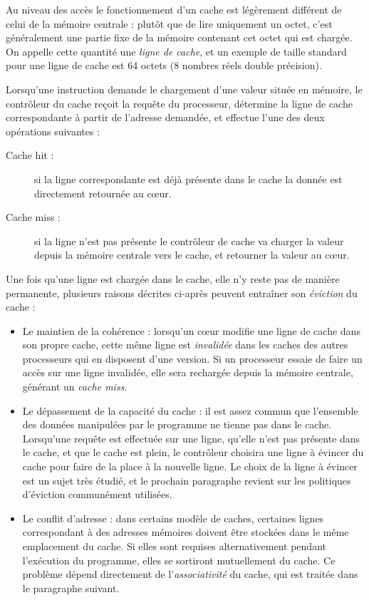 Au niveau des accès le fonctionnement d'un cache est légèrement différent de celui de la mémoire centrale : plutôt que de lire uniquement un octet, c'est généralement une partie fixe de la mémoire contenant cet octet qui est chargée.
On appelle cette quantité une \emph{ligne de cache}, et un exemple de taille standard pour une ligne de cache est 64 octets (8 nombres réels double précision).

Lorsqu'une instruction demande le chargement d'une valeur située en mémoire, le contrôleur du cache reçoit la requête du processeur, détermine la ligne de cache correspondante à partir de l'adresse demandée, et effectue l'une des deux opérations suivantes :
\begin{description}
  \item [Cache hit :] si la ligne correspondante est déjà présente dans le cache la donnée est directement retournée au cœur.
  \item [Cache miss :] si la ligne n'est pas présente le contrôleur de cache va charger la valeur depuis la mémoire centrale vers le cache, et retourner la valeur au cœur.
\end{description}

Une fois qu'une ligne est chargée dans le cache, elle n'y reste pas de manière permanente, plusieurs raisons décrites ci-après peuvent entraîner son \emph{éviction} du cache :

\begin{itemize}
  \item Le maintien de la cohérence : lorsqu'un cœur modifie une ligne de cache dans son propre cache, cette même ligne est \emph{invalidée} dans les caches des autres processeurs qui en disposent d'une version.
Si un processeur essaie de faire un accès sur une ligne invalidée, elle sera rechargée depuis la mémoire centrale, générant un \emph{cache miss}.
  \item Le dépassement de la capacité du cache : il est assez commun que l'ensemble des données manipulées par le programme ne tienne pas dans le cache.
Lorsqu'une requête est effectuée sur une ligne, qu'elle n'est pas présente dans le cache, et que le cache est plein, le contrôleur choisira une ligne à évincer du cache pour faire de la place à la nouvelle ligne.
Le choix de la ligne à évincer est un sujet très étudié, et le prochain paragraphe revient sur les politiques d'éviction communément utilisées.
  \item Le conflit d'adresse : dans certains modèle de caches, certaines lignes correspondant à des adresses mémoires doivent être stockées dans le même emplacement du cache.
    Si elles sont requises alternativement pendant l'exécution du programme, elles se sortiront mutuellement du cache.
    Ce problème dépend directement de l'\emph{associativité} du cache, qui est traitée dans le paragraphe suivant.
\end{itemize}



